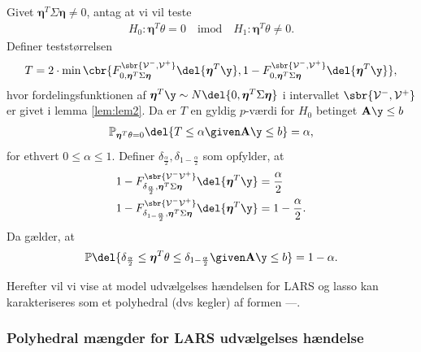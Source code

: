 \begin{lem} \label{lem:lem3}
Givet \(\boldsymbol{\eta}^T \Sigma \boldsymbol{\eta} \neq 0\), antag at vi vil teste
\begin{align*}
H_0: \boldsymbol{\eta}^T \theta=0 \quad \text{imod} \quad H_1: \boldsymbol{\eta}^T \theta \neq 0.
\end{align*}
Definer teststørrelsen
\begin{align}
T=2 \cdot \min\cbr{F_{0, \boldsymbol{\eta}^T \Sigma \boldsymbol{\eta}}^{\sbr{\mathcal{V}^-, \mathcal{V}^+}} \del{\boldsymbol{\eta}^T \y}, 1 - F_{0, \boldsymbol{\eta}^T \Sigma \boldsymbol{\eta}}^{\sbr{\mathcal{V}^-, \mathcal{V}^+}} \del{\boldsymbol{\eta}^T \y}}, \label{eq:post_1.18}
\end{align}
hvor fordelingsfunktionen af \(\boldsymbol{\eta}^T \y \sim N \del{0,  \boldsymbol{\eta}^T \Sigma \boldsymbol{\eta}}\) i intervallet \(\sbr{\mathcal{V}^-, \mathcal{V}^+}\) er givet i lemma \ref{lem:lem2}.
Da er \(T\) en gyldig \(p\)-værdi for \(H_0\) betinget \(\mathbf{A} \y \leq b\)
\begin{align*}
\mathbb{P}_{\boldsymbol{\eta}^T \theta=0} \del{T \leq \alpha \given \mathbf{A} \y \leq b} = \alpha,
\end{align*}
for ethvert \(0 \leq \alpha \leq 1\). 
Definer \(\delta_{\frac{\alpha}{2}}, \delta_{1-\frac{\alpha}{2}}\) som opfylder, at
\begin{align*}
1-F_{\delta_{\frac{\alpha}{2}}, \boldsymbol{\eta}^T \Sigma \boldsymbol{\eta}}^{\sbr{\mathcal{V}^- \mathcal{V}^+}} \del{\boldsymbol{\eta}^T \y} &= \frac{\alpha}{2} \\
1-F_{\delta_{1-\frac{\alpha}{2}}, \boldsymbol{\eta}^T \Sigma \boldsymbol{\eta} }^{\sbr{\mathcal{V}^- \mathcal{V}^+}} \del{\boldsymbol{\eta}^T \y} &= 1-\frac{\alpha}{2}.
\end{align*}
Da gælder, at
\begin{align*}
\mathbb{P} \del{\delta_{\frac{\alpha}{2}} \leq  \boldsymbol{\eta}^T \theta \leq \delta_{1-\frac{\alpha}{2}} \given \mathbf{A} \y \leq b} = 1- \alpha.
\end{align*}
\end{lem}

Herefter vil vi vise at model udvælgelses hændelsen for LARS og lasso kan karakteriseres som et polyhedral (dvs kegler) af formen ---.

\subsubsection{Polyhedral mængder for LARS udvælgelses hændelse}

